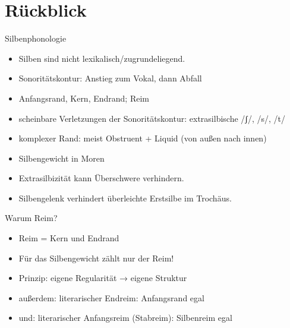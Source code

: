 
\section{Rückblick}

\begin{frame}
  {Silbenphonologie}
  \pause
  \begin{itemize}[<+->]
    \item Silben sind nicht lexikalisch\slash zugrundeliegend.
    \item Sonoritätskontur: Anstieg zum Vokal, dann Abfall
    \item Anfangsrand, Kern, Endrand; Reim
    \item scheinbare Verletzungen der Sonoritätskontur: \alert{extrasilbische} /ʃ/, /s/, /t/
    \item komplexer Rand: meist \alert{Obstruent + Liquid} (von außen nach innen)
    \item Silbengewicht in \alert{Moren} 
    \item Extrasilbizität kann Überschwere verhindern.
    \item Silbengelenk verhindert überleichte Erstsilbe im Trochäus.
  \end{itemize}
\end{frame}

\begin{frame}
  {Warum Reim?}
  \pause
  \begin{itemize}[<+->]
    \item Reim = Kern und Endrand
    \item \alert{Für das Silbengewicht zählt nur der Reim!}
    \item Prinzip: eigene Regularität → eigene Struktur
      \Zeile
    \item außerdem: literarischer \alert{Endreim}: \alert{Anfangsrand egal}
    \item und: literarischer \alert{Anfangsreim} (Stabreim): \alert{Silbenreim egal} 
  \end{itemize}
\end{frame}


